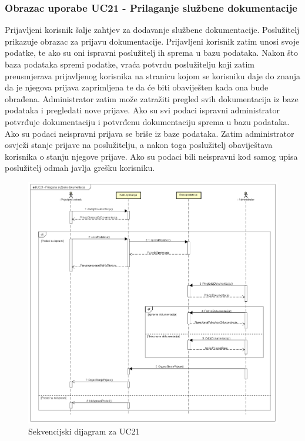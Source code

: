 				\subsubsection{Obrazac uporabe UC21 - Prilaganje službene dokumentacije}
				Prijavljeni korisnik šalje zahtjev za dodavanje službene dokumentacije. Poslužitelj prikazuje obrazac za prijavu dokumentacije. Prijavljeni korisnik zatim unosi svoje podatke, te ako su oni ispravni poslužitelj ih sprema u bazu podataka. Nakon što baza podataka spremi podatke, vraća potvrdu poslužitelju koji zatim preusmjerava prijavljenog korisnika na stranicu kojom se korisniku daje do znanja da je njegova prijava zaprimljena te da će biti obaviješten kada ona bude obrađena. Administrator zatim može zatražiti pregled svih dokumentacija iz baze podataka i pregledati nove prijave. Ako su svi podaci ispravni administrator potvrđuje dokumentaciju i potvrđenu dokumentaciju sprema u bazu podataka. Ako su podaci neispravni prijava se briše iz baze podataka. Zatim administrator osvježi stanje prijave na poslužitelju, a nakon toga poslužitelj obaviještava korisnika o stanju njegove prijave. Ako su podaci bili neispravni kod samog upisa poslužitelj odmah javlja grešku korisniku.
				
				\begin{figure}[H]
					\includegraphics[width=\textwidth]{slike/UC21_SEKV_DIJ.png}
					\caption{Sekvencijski dijagram za UC21 }
				\end{figure}
		\eject
